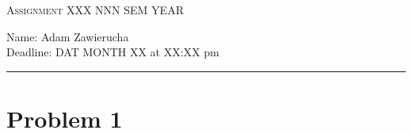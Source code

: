 \documentclass{article}
\begin{document}
	
	\textsc{\large Assignment} 
    \hfill
	\textsc{XXX NNN SEM YEAR}
    
    Name: Adam Zawierucha  \\
	Deadline: DAT MONTH XX at XX:XX pm
	
	\noindent\rule{\textwidth}{0.4pt}
    
    \section*{Problem 1}
    
\end{document}
